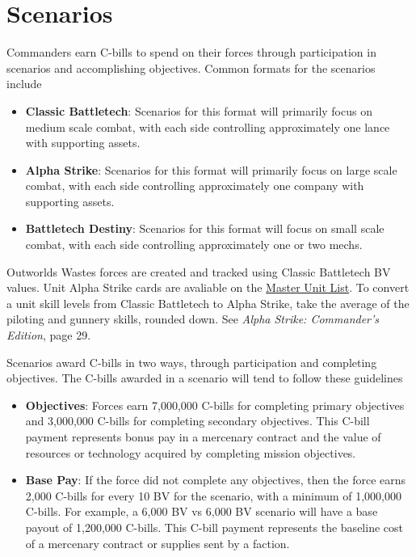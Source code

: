 \documentclass[UTF8]{article}
\begin{document}
\newpage

\section{Scenarios}

Commanders earn C-bills to spend on their forces through participation in scenarios and accomplishing objectives.
Common formats for the scenarios include

\begin{itemize}

\item {\bf Classic Battletech}: Scenarios for this format will primarily focus on medium scale combat, with each side controlling approximately one lance with supporting assets.

\item {\bf Alpha Strike}: Scenarios for this format will primarily focus on large scale combat, with each side controlling approximately one company with supporting assets.

\item {\bf Battletech Destiny}: Scenarios for this format will focus on small scale combat, with each side controlling approximately one or two mechs.

\end{itemize}

Outworlds Wastes forces are created and tracked using Classic Battletech BV values.
Unit Alpha Strike cards are avaliable on the \href{http://www.masterunitlist.info/}{Master Unit List}.
To convert a unit skill levels from Classic Battletech to Alpha Strike, take the average of the piloting and gunnery skills, rounded down.
See \emph{Alpha Strike: Commander's Edition}, page 29.

Scenarios award C-bills in two ways, through participation and completing objectives.
The C-bills awarded in a scenario will tend to follow these guidelines

\begin{itemize}

\item {\bf Objectives}: Forces earn 7,000,000 C-bills for completing primary objectives and 3,000,000 C-bills for completing secondary objectives.
This C-bill payment represents bonus pay in a mercenary contract and the value of resources or technology acquired by completing mission objectives.

\item {\bf Base Pay}: If the force did not complete any objectives, then the force earns 2,000 C-bills for every 10 BV for the scenario, with a minimum of 1,000,000 C-bills.
For example, a 6,000 BV vs 6,000 BV scenario will have a base payout of 1,200,000 C-bills.
This C-bill payment represents the baseline cost of a mercenary contract or supplies sent by a faction.

\end{itemize}
\end{document}
